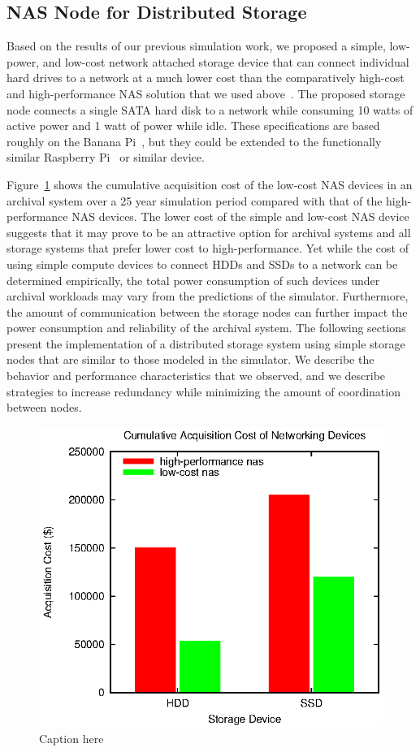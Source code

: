 \subsection{NAS Node for Distributed Storage}
Based on the results of our previous simulation work, we proposed a simple, low-power, and low-cost network attached storage device that can connect individual hard drives to a network at a much lower cost than the comparatively high-cost and high-performance NAS solution that we used above~\cite{web35}.  The proposed storage node connects a single SATA hard disk to a network while consuming 10 watts of active power and 1 watt of power while idle.  These specifications are based roughly on the Banana Pi~\cite{web40}, but they could be extended to the functionally similar Raspberry Pi~\cite{web49} or similar device.

Figure~\ref{fig2} shows the cumulative acquisition cost of the low-cost NAS devices in an archival system over a 25 year simulation period compared with that of the high-performance NAS devices.  The lower cost of the simple and low-cost NAS device suggests that it may prove to be an attractive option for archival systems and all storage systems that prefer lower cost to high-performance.  Yet while the cost of using simple compute devices to connect HDDs and SSDs to a network can be determined empirically, the total power consumption of such devices under archival workloads may vary from the predictions of the simulator.  Furthermore, the amount of communication between the storage nodes can further impact the power consumption and reliability of the archival system.  The following sections present the implementation of a distributed storage system using simple storage nodes that are similar to those modeled in the simulator.  We describe the behavior and performance characteristics that we observed, and we describe strategies to increase redundancy while minimizing the amount of coordination between nodes.

\begin{figure}[!ht]
\includegraphics[width=\linewidth]{fig2.eps}
\caption{Caption here}
\label{fig2}
\end{figure}

